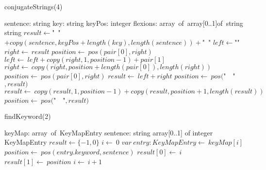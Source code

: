 \documentclass[a4paper,10pt]{article}
\begin{document}
\begin{algorithm}
\caption{conjugateStrings(4)}
\begin{algorithmic}[5]
    \State sentence: string
    \State key: string
    \State keyPos: integer
    \State flexions: array\ of\ array[0..1]of\ string
  \EndDecl
    \State string
  \EndDecl
  \State \(result\gets\)"{}\ "{}\(+copy(sentence,keyPos+length(key),length(sentence))+\)"{}\ "{}\(\)
    \State \(left\gets\)"{}"{}\(\)
    \State \(right\gets\ result\)
    \State \(position\gets\ pos(pair[0],right)\)
      \State \(left\gets\ left+copy(right,1,position-1)+pair[1]\)
      \State \(right\gets\ copy(right,position+length(pair[0]),length(right))\)
      \State \(position\gets\ pos(pair[0],right)\)
    \EndWhile
    \State \(result\gets\ left+right\)
  \EndFor
  \State \(position\gets\ pos(\)"{}\ \ "{}\(,result)\)
    \State \(result\gets\ copy(result,1,position-1)+copy(result,position+1,length(result))\)
    \State \(position\gets\ pos(\)"{}\ \ "{}\(,result)\)
  \EndWhile
\EndFunction
\end{algorithmic}
\end{algorithm}


\begin{algorithm}
\caption{findKeyword(2)}
\begin{algorithmic}[5]
\State {}
\State {}
\State {}
\State {}
\State {}
\State {}
    \State keyMap: array\ of\ KeyMapEntry
    \State sentence: string
  \EndDecl
    \State array[0..1] of integer
  \EndDecl
    \State KeyMapEntry
  \EndDecl
  \State \(result\gets\{-1,0\}\)
  \State \(i\gets\ 0\)
    \State \(var\ entry:KeyMapEntry\gets\ keyMap[i]\)
    \State \(position\gets\ pos(entry.keyword,sentence)\)
      \State \(result[0]\gets\ i\)
      \State \(result[1]\gets\ position\)
    \EndIf
    \State \(i\gets\ i+1\)
  \EndWhile
\EndFunction
\end{algorithmic}
\end{algorithm}
\end{document}
